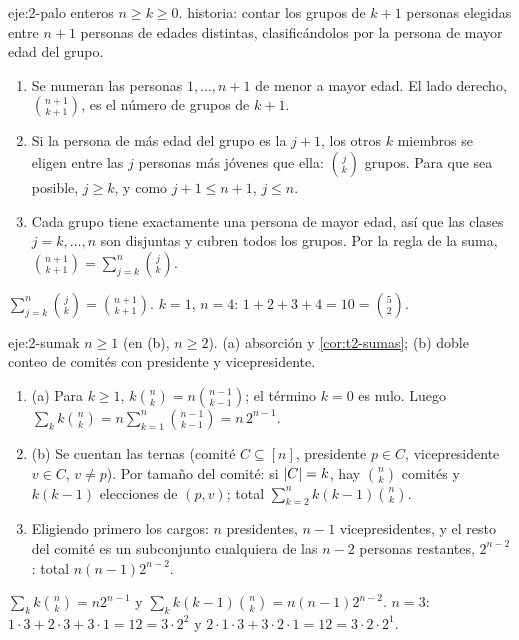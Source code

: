 \begin{solucion}{eje:2-palo}
\datos enteros $n\ge k\ge0$.
\planteamiento historia: contar los grupos de $k+1$ personas elegidas entre $n+1$ personas de edades distintas, clasificándolos por la persona de mayor edad del grupo.
\pasos
\begin{enumerate}[label=\arabic*.]
  \item Se numeran las personas $1,\dots,n+1$ de menor a mayor edad. El lado derecho, $\binom{n+1}{k+1}$, es el número de grupos de $k+1$.
  \item Si la persona de más edad del grupo es la $j+1$, los otros $k$ miembros se eligen entre las $j$ personas más jóvenes que ella: $\binom jk$ grupos. Para que sea posible, $j\ge k$, y como $j+1\le n+1$, $j\le n$.
  \item Cada grupo tiene exactamente una persona de mayor edad, así que las clases $j=k,\dots,n$ son disjuntas y cubren todos los grupos. Por la regla de la suma, $\binom{n+1}{k+1}=\sum_{j=k}^{n}\binom jk$.
\end{enumerate}
\resultado $\sum_{j=k}^{n}\binom jk=\binom{n+1}{k+1}$.
\comprobacion $k=1$, $n=4$: $1+2+3+4=10=\binom52$.
\end{solucion}

\begin{solucion}{eje:2-sumak}
\datos $n\ge1$ (en (b), $n\ge2$).
\planteamiento (a) absorción y \cref{cor:t2-sumas}; (b) doble conteo de comités con presidente y vicepresidente.
\pasos
\begin{enumerate}[label=\arabic*.]
  \item (a) Para $k\ge1$, $k\binom nk=n\binom{n-1}{k-1}$; el término $k=0$ es nulo. Luego $\sum_kk\binom nk=n\sum_{k=1}^{n}\binom{n-1}{k-1}=n\,2^{n-1}$.
  \item (b) Se cuentan las ternas (comité $C\subseteq[n]$, presidente $p\in C$, vicepresidente $v\in C$, $v\neq p$). Por tamaño del comité: si $\lvert C\rvert=k$, hay $\binom nk$ comités y $k(k-1)$ elecciones de $(p,v)$; total $\sum_{k=2}^{n}k(k-1)\binom nk$.
  \item Eligiendo primero los cargos: $n$ presidentes, $n-1$ vicepresidentes, y el resto del comité es un subconjunto cualquiera de las $n-2$ personas restantes, $2^{n-2}$: total $n(n-1)2^{n-2}$.
\end{enumerate}
\resultado $\sum_kk\binom nk=n2^{n-1}$ y $\sum_kk(k-1)\binom nk=n(n-1)2^{n-2}$.
\comprobacion $n=3$: $1\cdot3+2\cdot3+3\cdot1=12=3\cdot2^{2}$ y $2\cdot1\cdot3+3\cdot2\cdot1=12=3\cdot2\cdot2^{1}$.
\end{solucion}

